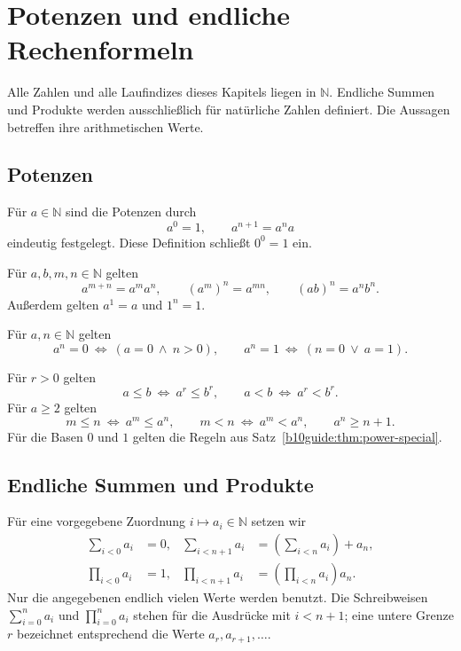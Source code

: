 \chapter{Potenzen und endliche Rechenformeln}
\label{b10guide:ch:calculus}

Alle Zahlen und alle Laufindizes dieses Kapitels liegen in $\mathbb N$.
Endliche Summen und Produkte werden ausschließlich für natürliche
Zahlen definiert. Die Aussagen betreffen ihre arithmetischen Werte.

\section{Potenzen}

\begin{definition}
\label{b10guide:def:powers}
Für $a\in\mathbb N$ sind die Potenzen durch
\[
 a^0=1,\qquad a^{n+1}=a^n a
\]
eindeutig festgelegt. Diese Definition schließt $0^0=1$ ein.
\end{definition}

\begin{theorem}[Potenzgesetze]
\label{b10guide:thm:power-laws}
Für $a,b,m,n\in\mathbb N$ gelten
\[
 a^{m+n}=a^m a^n,\qquad
 (a^m)^n=a^{mn},\qquad
 (ab)^n=a^n b^n.
\]
Außerdem gelten $a^1=a$ und $1^n=1$.
\end{theorem}

\begin{theorem}
\label{b10guide:thm:power-special}
Für $a,n\in\mathbb N$ gelten
\[
 a^n=0\ \Longleftrightarrow\ (a=0\ \land\ n>0),
 \qquad
 a^n=1\ \Longleftrightarrow\ (n=0\ \lor\ a=1).
\]
\end{theorem}

\begin{theorem}
\label{b10guide:thm:power-order}
Für $r>0$ gelten
\[
 a\le b\ \Longleftrightarrow\ a^r\le b^r,
 \qquad
 a<b\ \Longleftrightarrow\ a^r<b^r.
\]
Für $a\ge2$ gelten
\[
 m\le n\ \Longleftrightarrow\ a^m\le a^n,
 \qquad
 m<n\ \Longleftrightarrow\ a^m<a^n,
 \qquad a^n\ge n+1.
\]
Für die Basen $0$ und $1$ gelten die Regeln aus
Satz~\ref{b10guide:thm:power-special}.
\end{theorem}

\section{Endliche Summen und Produkte}

\begin{definition}
\label{b10guide:def:finite-calculus}
Für eine vorgegebene Zuordnung $i\mapsto a_i\in\mathbb N$ setzen wir
\[
 \begin{aligned}
 \sum_{i<0}a_i&=0,&
 \sum_{i<n+1}a_i&=\left(\sum_{i<n}a_i\right)+a_n,\\
 \prod_{i<0}a_i&=1,&
 \prod_{i<n+1}a_i&=\left(\prod_{i<n}a_i\right)a_n.
 \end{aligned}
\]
Nur die angegebenen endlich vielen Werte werden benutzt.
Die Schreibweisen $\sum_{i=0}^{n}a_i$ und $\prod_{i=0}^{n}a_i$
stehen für die Ausdrücke mit $i<n+1$; eine untere Grenze $r$
bezeichnet entsprechend die Werte $a_r,a_{r+1},\ldots$.
\end{definition}

